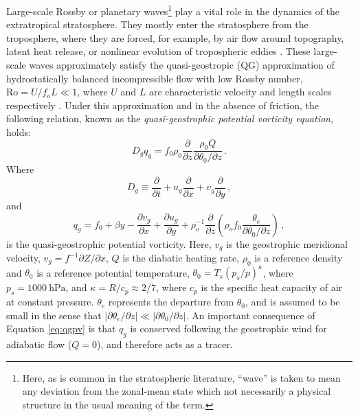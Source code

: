 Large-scale Rossby or planetary waves\footnote{Here, as is common in the
  stratospheric literature, ``wave'' is taken to mean any deviation from the
  zonal-mean state which not necessarily a physical structure in the usual
  meaning of the term.} play a vital
role in the dynamics of the extratropical stratosphere. They mostly enter the
stratosphere from the troposphere, where they are forced, for example, by air
flow around topography, latent heat release, or nonlinear evolution of
tropospheric eddies \citep{Scinocca1998}. These large-scale waves approximately
satisfy the quasi-geostropic (QG) approximation of hydrostatically balanced
incompressible flow with low Rossby number, $\mathrm{Ro} = U/f_oL \ll 1$, where
$U$ and $L$ are characteristic velocity and length scales respectively
\citep{Andrews1987}. Under this approximation and in the absence of friction,
the following relation, known as the \emph{quasi-geostrophic potential vorticity
  equation}, holds:
\begin{equation}
D_gq_g = f_0\rho_0 \frac{\partial}{\partial z}
\frac{\rho_0Q}{\partial\theta_{0}/\partial z} \, . 
\label{eq:qgpv}
\end{equation}
Where
\begin{equation}
D_g \equiv \frac{\partial}{\partial t} + u_g\frac{\partial}{\partial x} +
v_g\frac{\partial}{\partial y} \, , 
\end{equation}
and 
\begin{equation}
  q_g = f_0 + \beta y - \frac{\partial v_g}{\partial x} + \frac{\partial u_g}{\partial
    y} + \rho_o^{-1}\frac{\partial}{\partial
    z}\left(\rho_of_0\frac{\theta_e}{\partial\theta_{0}/\partial z}\right) \, , 
\end{equation}
is the quasi-geostrophic potential vorticity. Here, $v_g$ is the geostrophic
meridional velocity, $v_g = f^{-1}\partial Z/\partial x$, $Q$ is the diabatic
heating rate, $\rho_0$ is a reference density and $\theta_0$ is a reference
potential temperature, $\theta_0 = T_s(p_s/p)^\kappa$, where
$p_s=1000~\mathrm{hPa}$, and $\kappa = R/c_p \approx 2/7$, where $c_p$ is the
specific heat capacity of air at constant pressure. $\theta_e$ represents the
departure from $\theta_0$, and is assumed to be small in the sense that
$|\partial\theta_e/\partial z| \ll |\partial\theta_0/\partial z|$. An important
consequence of Equation \ref{eq:qgpv} is that $q_g$ is conserved following the
geostrophic wind for adiabatic flow ($Q=0$), and therefore acts as a tracer.
